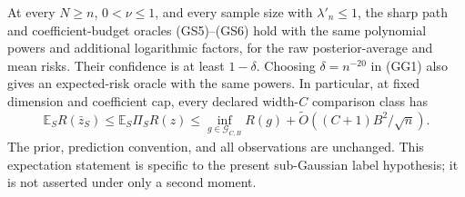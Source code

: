 \begin{corollary}
At every $N\ge n$, $0<\nu\le1$, and every sample size with
$\lambda'_n\le1$, the sharp path and coefficient-budget oracles
(GS5)--(GS6) hold with the same polynomial powers and additional
logarithmic factors, for the raw posterior-average and mean risks.
Their confidence is at least $1-\delta$.
Choosing $\delta=n^{-20}$ in (GG1) also gives an expected-risk
oracle with the same powers. In particular, at fixed dimension and
coefficient cap, every declared width-$C$ comparison class has
\[
 \mathbb E_S R(\bar z_{S})\le
 \mathbb E_S\Pi_S R(z)
 \le \inf_{g\in\mathcal G_{C,B}}R(g)
          +\widetilde O((C+1)B^2/\sqrt n).
\]
The prior, prediction convention, and all observations are unchanged.
This expectation statement is specific to the present sub-Gaussian
label hypothesis; it is not asserted under only a second moment.
\end{corollary}
